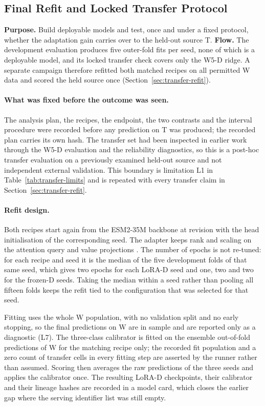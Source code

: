 \subsection{Final Refit and Locked Transfer Protocol}\label{sec:refit-protocol}
\textbf{Purpose.} Build deployable models and test, once and under a fixed protocol, whether the adaptation gain carries over to the held-out source T.
\textbf{Flow.} The development evaluation produces five outer-fold fits per seed, none of which is a deployable
model, and its locked transfer check covers only the W5-D ridge. A separate campaign therefore refitted
both matched recipes on all permitted W data and scored the held source once
(Section~\ref{sec:transfer-refit}).

\paragraph{What was fixed before the outcome was seen.}
The analysis plan, the recipes, the endpoint, the two contrasts and the interval procedure were
recorded before any prediction on T was produced; the recorded plan carries its own hash. The
transfer set had been inspected in earlier work through the W5-D evaluation and the reliability
diagnostics, so this is a post-hoc transfer evaluation on a previously examined held-out source and
not independent external validation. This boundary is limitation L1 in
Table~\ref{tab:transfer-limits} and is repeated with every transfer claim in
Section~\ref{sec:transfer-refit}.

\paragraph{Refit design.}
Both recipes start again from the ESM2-35M backbone at revision \nTBaseRevision{}
\citep{lin2023esm} with the head initialisation of the corresponding seed. The adapter keeps rank
\nTAdapterRank{} and scaling \nTAdapterAlpha{} on the attention query and value projections
\citep{hu2022lora}. The number of epochs is not re-tuned: for each recipe and seed it is the median
of the five development folds of that same seed, which gives two epochs for each LoRA-D seed and
one, two and two for the frozen-D seeds. Taking the median within a seed rather than pooling all
fifteen folds keeps the refit tied to the configuration that was selected for that seed.

Fitting uses the whole W population, with no validation split and no early stopping, so the final
predictions on W are in sample and are reported only as a diagnostic (L7). The three-class
calibrator is fitted on the ensemble out-of-fold predictions of W for the matching recipe only;
the recorded fit population and a zero count of transfer cells in every fitting step are asserted
by the runner rather than assumed. Scoring then averages the raw predictions of the three seeds and
applies the calibrator once. The resulting \nTModelCount{} LoRA-D checkpoints, their calibrator and
their lineage hashes are recorded in a model card, which closes the earlier gap where the serving
identifier list was still empty.

